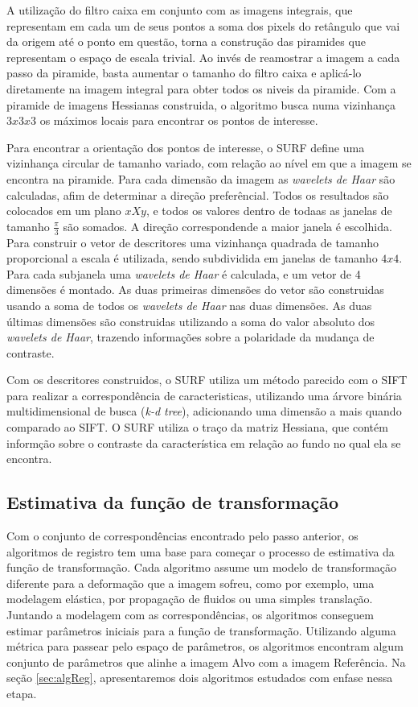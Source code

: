   A utilização do filtro caixa em conjunto com as imagens integrais, que representam em cada um de seus pontos a soma
dos pixels do retângulo que vai da origem até o ponto em questão, torna a construção das piramides que representam o
espaço de escala trivial. Ao invés de reamostrar a imagem a cada passo da piramide, basta aumentar o tamanho do filtro
caixa e aplicá-lo diretamente na imagem integral para obter todos os niveis da piramide. Com a piramide de imagens
Hessianas construida, o algoritmo busca numa vizinhança $3x3x3$ os máximos locais para encontrar os pontos de interesse.

  Para encontrar a orientação dos pontos de interesse, o SURF define uma vizinhança circular de tamanho variado, com
relação ao nível em que a imagem se encontra na piramide. Para cada dimensão da imagem as \textit{wavelets de Haar} são
calculadas, afim de determinar a direção preferêncial. Todos os resultados são colocados em um plano $xXy$, e todos os 
valores dentro de todaas as janelas de tamanho $\frac{\pi}{3}$ são somados. A direção correspondende a maior janela é 
escolhida. Para construir o vetor de descritores uma vizinhança quadrada de tamanho proporcional a escala é utilizada,
sendo subdividida em janelas de tamanho $4x4$. Para cada subjanela uma \textit{wavelets de Haar} é calculada, e um vetor
de 4 dimensões é montado. As duas primeiras dimensões do vetor são construidas usando a soma de todos os 
\textit{wavelets de Haar} nas duas dimensões. As duas últimas dimensões são construidas utilizando a soma do valor 
absoluto dos \textit{wavelets de Haar}, trazendo informações sobre a polaridade da mudança de contraste.

  Com os descritores construidos, o SURF utiliza um método parecido com o SIFT para realizar a correspondência de 
caracteristicas, utilizando uma árvore binária multidimensional de busca (\textit{k-d tree}), adicionando uma dimensão a 
mais quando comparado ao SIFT. O SURF utiliza o traço da matriz Hessiana, que contém informção sobre o contraste da 
característica em relação ao fundo no qual ela se encontra.

\subsection{Estimativa da função de transformação}
    
Com o conjunto de correspondências encontrado pelo passo anterior, os algoritmos de registro tem uma base para 
começar o processo de estimativa da função de transformação. Cada algoritmo assume um modelo de transformação diferente
para a deformação que a imagem sofreu, como por exemplo, uma modelagem elástica, por propagação de fluidos ou uma
simples translação. Juntando a modelagem com as correspondências, os algoritmos conseguem estimar parâmetros iniciais
para a função de transformação. Utilizando alguma métrica para passear pelo espaço de parâmetros, os algoritmos encontram
algum conjunto de parâmetros que alinhe a imagem Alvo com a imagem Referência. Na seção \ref{sec:algReg}, apresentaremos
dois algoritmos estudados com enfase nessa etapa.

